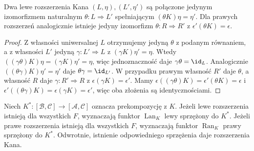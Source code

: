 \begin{stwierdzenie}[Jednoznaczność]\label{cat:prop:kan-unique}
Dwa lewe rozszerzenia Kana $(L,\eta),(L',\eta')$ są połączone jedynym izomorfizmem naturalnym $\theta:L\Rightarrow L'$ spełniającym $(\theta K)\eta=\eta'$. Dla prawych rozszerzeń analogicznie istnieje jedyny izomorfizm $\theta:R\Rightarrow R'$ z $\epsilon'(\theta K)=\epsilon$.
\end{stwierdzenie}
\begin{proof}
Z własności uniwersalnej $L$ otrzymujemy jedyną $\theta$ z podanym równaniem, a z własności $L'$ jedyną $\gamma:L'\Rightarrow L$ z $(\gamma K)\eta'=\eta$. Wtedy $((\gamma\theta)K)\eta=(\gamma K)\eta'=\eta$, więc jednoznaczność daje $\gamma\theta=\id_L$. Analogicznie $((\theta\gamma)K)\eta'=\eta'$ daje $\theta\gamma=\id_{L'}$. W przypadku prawym własność $R'$ daje $\theta$, a własność $R$ daje $\gamma:R'\Rightarrow R$ z $\epsilon(\gamma K)=\epsilon'$. Mamy $\epsilon((\gamma\theta)K)=\epsilon'(\theta K)=\epsilon$ i $\epsilon'((\theta\gamma)K)=\epsilon(\gamma K)=\epsilon'$, więc oba złożenia są identycznościami.
\end{proof}
\begin{twierdzenie}\label{cat:thm:kan-adjunction}
Niech $K^*:[\mathcal B,\mathcal C]\to[\mathcal A,\mathcal C]$ oznacza prekompozycję z $K$. Jeżeli lewe rozszerzenia istnieją dla wszystkich $F$, wyznaczają funktor $\operatorname{Lan}_K$ lewy sprzężony do $K^*$. Jeżeli prawe rozszerzenia istnieją dla wszystkich $F$, wyznaczają funktor $\operatorname{Ran}_K$ prawy sprzężony do $K^*$. Odwrotnie, istnienie odpowiedniego sprzężenia daje rozszerzenia Kana.
\end{twierdzenie}

